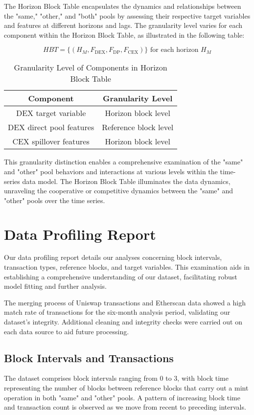 \documentclass{article}
\begin{document}
The Horizon Block Table encapsulates the dynamics and relationships between the "same," "other," and "both" pools by assessing their respective target variables and features at different horizons and lags. The granularity level varies for each component within the Horizon Block Table, as illustrated in the following table:

\begin{equation}
HBT = \{ (H_{M}, F_{\text{DEX}}, F_{\text{DP}}, F_{\text{CEX}}) \} \text{ for each horizon } H_{M} 
\end{equation}

\begin{table}[htbp]
\centering
\begin{tabular}{|c|c|}
\hline
\textbf{Component} & \textbf{Granularity Level} \\
\hline
DEX target variable & Horizon block level \\
\hline
DEX direct pool features & Reference block level \\
\hline
CEX spillover features & Horizon block level \\
\hline
\end{tabular}
\caption{Granularity Level of Components in Horizon Block Table}
\label{table:granularity}
\end{table}

This granularity distinction enables a comprehensive examination of the "same" and "other" pool behaviors and interactions at various levels within the time-series data model. The Horizon Block Table illuminates the data dynamics, unraveling the cooperative or competitive dynamics between the "same" and "other" pools over the time series.

\section{Data Profiling Report}
Our data profiling report details our analyses concerning block intervals, transaction types, reference blocks, and target variables. This examination aids in establishing a comprehensive understanding of our dataset, facilitating robust model fitting and further analysis.

The merging process of Uniswap transactions and Etherscan data showed a high match rate of transactions for the six-month analysis period, validating our dataset's integrity. Additional cleaning and integrity checks were carried out on each data source to aid future processing.

\subsection{Block Intervals and Transactions}
The dataset comprises block intervals ranging from 0 to 3, with block time representing the number of blocks between reference blocks that carry out a mint operation in both "same" and "other" pools. A pattern of increasing block time and transaction count is observed as we move from recent to preceding intervals. 
\end{document}
